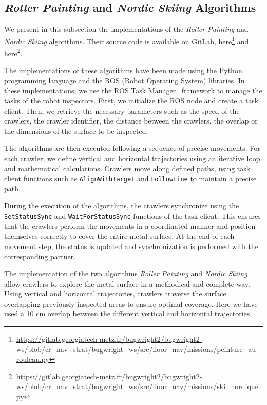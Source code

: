 \subsection*{\textit{Roller Painting} and \textit{Nordic Skiing} Algorithms}

We present in this subsection the implementations of the \textit{Roller Painting} and \textit{Nordic Skiing} algorithms.
Their source code is available on GitLab, here\footnote{\url{https://gitlab.georgiatech-metz.fr/bugwright2/bugwright2-ws/blob/cr_nav_strat/bugwright_ws/src/floor_nav/missions/peinture_au_rouleau.py}} and here\footnote{\url{https://gitlab.georgiatech-metz.fr/bugwright2/bugwright2-ws/blob/cr_nav_strat/bugwright_ws/src/floor_nav/missions/ski_nordique.py}}.

The implementations of these algorithms have been made using the Python programming language and the ROS (Robot Operating System) libraries.
In these implementations, we use the ROS Task Manager~\cite{ROSTaskManager} framework to manage the tasks of the robot inspectors.
First, we initialize the ROS node and create a task client.
Then, we retrieve the necessary parameters such as the speed of the crawlers, the crawler identifier, the distance between the crawlers, the overlap or the dimensions of the surface to be inspected.

The algorithms are then executed following a sequence of precise movements.
For each crawler, we define vertical and horizontal trajectories using an iterative loop and mathematical calculations.
Crawlers move along defined paths, using task client functions such as \texttt{AlignWithTarget} and \texttt{FollowLine} to maintain a precise path.

During the execution of the algorithms, the crawlers synchronize using the \texttt{SetStatusSync} and \texttt{WaitForStatusSync} functions of the task client.
This ensures that the crawlers perform the movements in a coordinated manner and position themselves correctly to cover the entire metal surface.
At the end of each movement step, the status is updated and synchronization is performed with the corresponding partner.

The implementation of the two algorithms \textit{Roller Painting} and \textit{Nordic Skiing} allow crawlers to explore the metal surface in a methodical and complete way.
Using vertical and horizontal trajectories, crawlers traverse the surface overlapping previously inspected areas to ensure optimal coverage.
Here we have used a 10 cm overlap between the different vertical and horizontal trajectories.

